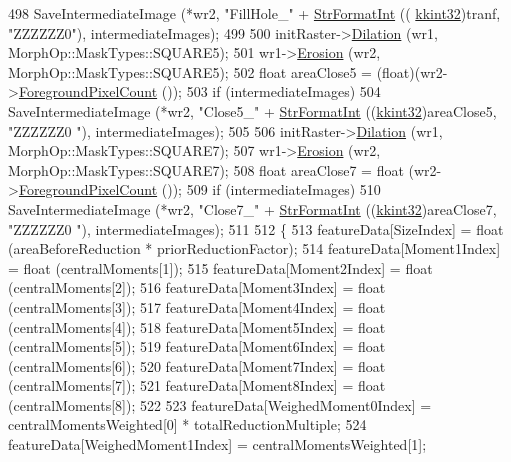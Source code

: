 \begin{DoxyCode}
498     SaveIntermediateImage (*wr2, \textcolor{stringliteral}{"FillHole\_"} + \hyperlink{namespace_k_k_b_ae3bde258fa036604fac8bdb0277ab46e}{StrFormatInt} ((
      \hyperlink{namespace_k_k_b_a8fa4952cc84fda1de4bec1fbdd8d5b1b}{kkint32})tranf, \textcolor{stringliteral}{"ZZZZZZ0"}), intermediateImages);
499 
500   initRaster->\hyperlink{class_k_k_b_1_1_raster_afb263b7cc4ab60bf6745c5166173bbb9}{Dilation} (wr1, MorphOp::MaskTypes::SQUARE5);
501   wr1->\hyperlink{class_k_k_b_1_1_raster_a5a019718e60c06c4262e8127232ff19c}{Erosion} (wr2, MorphOp::MaskTypes::SQUARE5);
502   \textcolor{keywordtype}{float}  areaClose5 = (float)(wr2->\hyperlink{class_k_k_b_1_1_raster_a38425a410e40696276be4f22de702eb6}{ForegroundPixelCount} ());
503   \textcolor{keywordflow}{if}  (intermediateImages)
504     SaveIntermediateImage (*wr2, \textcolor{stringliteral}{"Close5\_"} + \hyperlink{namespace_k_k_b_ae3bde258fa036604fac8bdb0277ab46e}{StrFormatInt} ((\hyperlink{namespace_k_k_b_a8fa4952cc84fda1de4bec1fbdd8d5b1b}{kkint32})areaClose5, \textcolor{stringliteral}{"ZZZZZZ0
      "}), intermediateImages);
505   
506   initRaster->\hyperlink{class_k_k_b_1_1_raster_afb263b7cc4ab60bf6745c5166173bbb9}{Dilation} (wr1, MorphOp::MaskTypes::SQUARE7);
507   wr1->\hyperlink{class_k_k_b_1_1_raster_a5a019718e60c06c4262e8127232ff19c}{Erosion}   (wr2, MorphOp::MaskTypes::SQUARE7);
508   \textcolor{keywordtype}{float}  areaClose7 = float (wr2->\hyperlink{class_k_k_b_1_1_raster_a38425a410e40696276be4f22de702eb6}{ForegroundPixelCount} ());
509   \textcolor{keywordflow}{if}  (intermediateImages)
510     SaveIntermediateImage (*wr2, \textcolor{stringliteral}{"Close7\_"} + \hyperlink{namespace_k_k_b_ae3bde258fa036604fac8bdb0277ab46e}{StrFormatInt} ((\hyperlink{namespace_k_k_b_a8fa4952cc84fda1de4bec1fbdd8d5b1b}{kkint32})areaClose7, \textcolor{stringliteral}{"ZZZZZZ0
      "}), intermediateImages);
511 
512   \{
513     featureData[SizeIndex]    = float (areaBeforeReduction * priorReductionFactor);
514     featureData[Moment1Index] = float (centralMoments[1]);
515     featureData[Moment2Index] = float (centralMoments[2]);
516     featureData[Moment3Index] = float (centralMoments[3]);
517     featureData[Moment4Index] = float (centralMoments[4]);
518     featureData[Moment5Index] = float (centralMoments[5]);
519     featureData[Moment6Index] = float (centralMoments[6]);
520     featureData[Moment7Index] = float (centralMoments[7]);
521     featureData[Moment8Index] = float (centralMoments[8]);
522 
523     featureData[WeighedMoment0Index] = centralMomentsWeighted[0] * totalReductionMultiple;
524     featureData[WeighedMoment1Index] = centralMomentsWeighted[1];

\end{DoxyCode}
